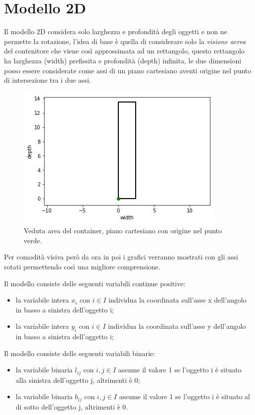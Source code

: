 \section{Modello 2D}
Il modello 2D considera solo larghezza e profondità degli oggetti e non ne permette la rotazione, l'idea di base è quella di considerare solo la \textit{visione aerea} del contenitore che viene così approssimata ad un rettangolo, questo rettangolo ha larghezza (width) prefissita e profondità (depth) infinita, le due dimensioni posso essere considerate come assi di un piano cartesiano aventi origine nel punto di intersezione tra i due assi.\\
\begin{figure}[!h]
    \begin{center} \includegraphics[scale=0.6]{figures/cartesian_wd}
        \caption[Veduta area - piano cartesiano]{Veduta area del container, piano cartesiano con origine nel punto verde.}  
        \label{fig:myInlineFigure}
    \end{center}
\end{figure}

\noindent Per comodità visiva però da ora in poi i grafici verranno mostrati con gli assi rotati permettendo così una migliore comprensione.

\noindent Il modello consiste delle seguenti variabili continue positive:
\begin{itemize}
    \item la variabile intera $x_{i}$ con $i \in I$ individua la coordinata sull'asse x dell'angolo in basso a sinistra dell'oggetto i;
    \item la variabile intera $y_{i}$ con $i \in I$ individua la coordinata sull'asse y dell'angolo in basso a sinistra dell'oggetto i;
\end{itemize}
Il modello consiste delle seguenti variabili binarie:
\begin{itemize}
    \item la variabile binaria $l_{ij}$ con $i,j \in I$ assume il valore 1 se l'oggetto i è situato alla sinistra dell'oggetto j, altrimenti è 0;
    \item la variabile binaria $b_{ij}$ con $i,j \in I$ assume il valore 1 se l'oggetto i è situato al di sotto dell'oggetto j, altrimenti è 0.
\end{itemize}


